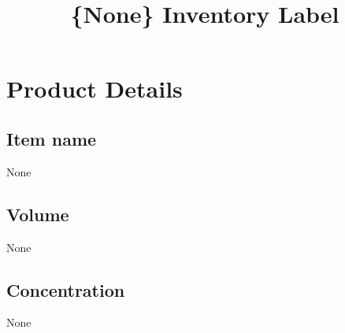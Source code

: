 \documentclass{article}%
\title{\{None\} Inventory Label}%
\begin{document}
%
\normalsize%
\pagestyle{header}%
\section*{Product Details}%
\label{sec:ProductDetails}%
\subsection*{\textbf{Item name}}%
\label{subsec:textbfItemname}%
None

%
\subsection*{\textbf{Volume}}%
\label{subsec:textbfVolume}%
None

%
\subsection*{\textbf{Concentration}}%
\label{subsec:textbfConcentration}%
None

%
\begin{mytextbox}%
\begin{itemize}%
\end{itemize}%
\end{mytextbox}%
\end{document}
